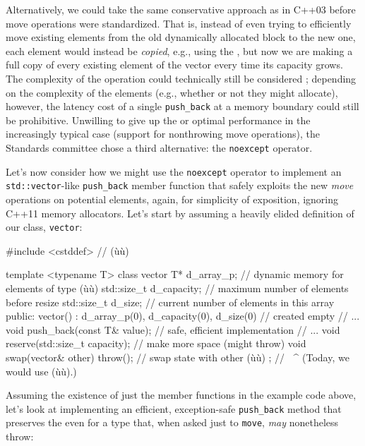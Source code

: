 Alternatively, we could take the same conservative approach as in C++03
before move operations were standardized. That is, instead of even
trying to efficiently move existing elements from the old dynamically
allocated block to the new one, each element would instead be
\emph{copied}, e.g., using the , but now we are
making a full copy of every existing element of the vector every time
its capacity grows. The complexity of the operation could technically
still be considered ; depending on the
complexity of the elements (e.g., whether or not they might allocate),
however, the latency cost of a single \lstinline!push_back! at a memory
boundary could still be prohibitive. Unwilling to give up the
 or optimal performance in the increasingly
typical case (support for nonthrowing move operations), the Standards
committee chose a third alternative: the \lstinline!noexcept!
operator.

Let's now consider how we might use the \lstinline!noexcept! operator to
implement an \lstinline!std::vector!-like \lstinline!push_back! member
function that safely exploits the new \emph{move} operations on
potential elements, again, for simplicity of exposition, ignoring C++11
memory allocators. Let's start by assuming a heavily elided definition
of our class, \lstinline!vector!:

\begin{emcppslisting}[emcppsbatch={e16,e17}]
#include <cstddef>  // (ù{}ù)

template <typename T>
class vector
{
    T*          d_array_p;   // dynamic memory for elements of type (ù{}ù)
    std::size_t d_capacity;  // maximum number of elements before resize
    std::size_t d_size;      // current number of elements in this array
public:
    vector() : d_array_p(0), d_capacity(0), d_size(0) { }  // created empty
    // ...
    void push_back(const T& value);  // safe, efficient implementation
    // ...
    void reserve(std::size_t capacity);  // make more space (might throw)
    void swap(vector& other) throw();    // swap state with other (ù{}ù)
};                        // ^^^^^^^        (Today, we would use (ù{}ù).)
\end{emcppslisting}
    

\noindent Assuming the existence of just the member functions in the example code
above, let's look at implementing an efficient, exception-safe
\lstinline!push_back! method that preserves the  even for a type that, when asked just to
\lstinline!move!, \emph{may} nonetheless throw:


